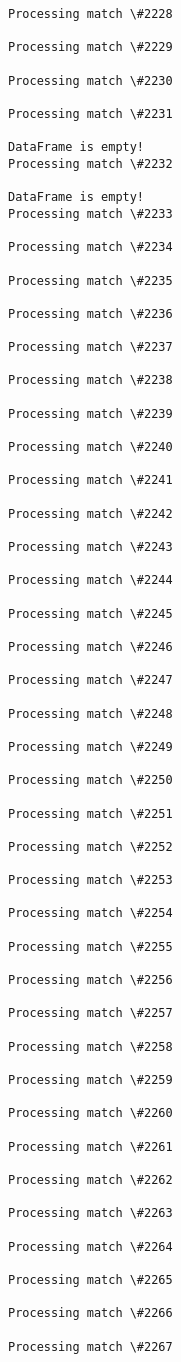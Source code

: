\documentclass[11pt]{article}
\begin{document}
\begin{Verbatim}[commandchars=\\\{\}]
Processing match \#2228

Processing match \#2229

Processing match \#2230

Processing match \#2231

DataFrame is empty!
Processing match \#2232

DataFrame is empty!
Processing match \#2233

Processing match \#2234

Processing match \#2235

Processing match \#2236

Processing match \#2237

Processing match \#2238

Processing match \#2239

Processing match \#2240

Processing match \#2241

Processing match \#2242

Processing match \#2243

Processing match \#2244

Processing match \#2245

Processing match \#2246

Processing match \#2247

Processing match \#2248

Processing match \#2249

Processing match \#2250

Processing match \#2251

Processing match \#2252

Processing match \#2253

Processing match \#2254

Processing match \#2255

Processing match \#2256

Processing match \#2257

Processing match \#2258

Processing match \#2259

Processing match \#2260

Processing match \#2261

Processing match \#2262

Processing match \#2263

Processing match \#2264

Processing match \#2265

Processing match \#2266

Processing match \#2267


\end{Verbatim}
\end{document}
